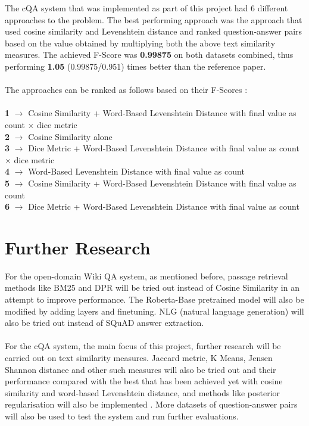 \documentclass[12pt, a4paper]{article}
\begin{document}
The cQA system that was implemented as part of this project had 6 different approaches to the problem. The best performing approach was the approach that used cosine similarity and Levenshtein distance and ranked question-answer pairs based on the value obtained by multiplying both the above text similarity measures. The achieved F-Score was \textbf{0.99875} on both datasets combined, thus performing \textbf{1.05} (0.99875/0.951) times better than the reference paper. 
\\~\\ 
The approaches can be ranked as follows based on their F-Scores : 
\\~\\ 
\textbf{1} \(\rightarrow\) Cosine Similarity + Word-Based Levenshtein Distance with final value as count \(\times\) dice metric \\ 
\textbf{2} \(\rightarrow\) Cosine Similarity alone \\ 
\textbf{3} \(\rightarrow\) Dice Metric + Word-Based Levenshtein Distance with final value as count \(\times\) dice metric \\ 
\textbf{4} \(\rightarrow\) Word-Based Levenshtein Distance with final value as count \\ 
\textbf{5} \(\rightarrow\) Cosine Similarity + Word-Based Levenshtein Distance with final value as count \\ 
\textbf{6} \(\rightarrow\) Dice Metric + Word-Based Levenshtein Distance with final value as count \\ 


\section{Further Research} 

For the open-domain Wiki QA system, as mentioned before, passage retrieval methods like BM25 and DPR will be tried out instead of Cosine Similarity in an attempt to improve performance. The Roberta-Base pretrained model will also be modified by adding layers and finetuning. NLG (natural language generation) will also be tried out instead of SQuAD answer extraction. 
\\~\\ 
For the cQA system, the main focus of this project, further research will be carried out on text similarity measures. Jaccard metric, K Means, Jensen Shannon distance and other such measures will also be tried out and their performance compared with the best that has been achieved yet with cosine similarity and word-based Levenshtein distance, and methods like posterior regularisation will also be implemented \cite{postreg}. More datasets of question-answer pairs will also be used to test the system and run further evaluations. 
\end{document}
